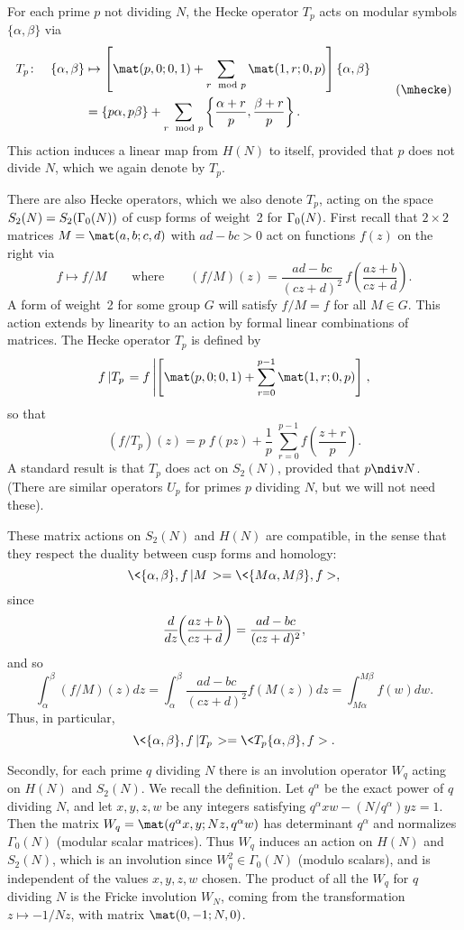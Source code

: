 For each prime $p$ not dividing $N$, the Hecke operator $T_p$
acts on modular symbols $\{\alpha,\beta\}$ via \neweq{\mhecke}
$$
\aligned
  T_p\colon\quad \{\alpha,\beta\} &\mapsto \left[\mat(p,0;0,1)
                     + \sum_{r \mod p}\mat(1,r;0,p)\right]\{\alpha,\beta\} \\
                                  &= \{p\alpha,p\beta\} +
          \sum_{r \mod p}\left\{\frac{\alpha+r}{p},\frac{\beta+r}{p}\right\}.
\endaligned\tag \mhecke
$$
This action induces a linear map from $H(N)$ to itself, provided that $p$
does not divide $N$, which we again denote by $T_p$.

There are also Hecke operators, which we also denote $T_p$, acting on the
space $S_2(N)=S_2(\G0(N))$ of cusp forms of weight~2 for $\G0(N)$.  
First recall that $2\times2$ matrices $M=\mat(a,b;c,d)$ with $ad-bc>0$ act on
functions $f(z)$ on the right via
$$
f\mapsto f\slash{M}\qquad\text{where}\qquad
(f\slash{M})(z)=\frac{ad-bc}{(cz+d)^2}\,f\left(\frac{az+b}{cz+d}\right). 
$$
A form of weight~2 for some group $G$ will satisfy $f\slash{M}=f$ for
all $M\in G$.  This action extends by linearity to an action by formal
linear combinations of matrices.  The Hecke operator $T_p$ is defined
by
$$
f\slash{T_p} = f\slash{\left[{\mat(p,0;0,1)} + \sum_{r=0}^{p-1}{\mat(1,r;0,p)}\right]},
$$
so that
$$
  \left(f\slash{T_p}\right)(z) = p\;f(pz) + \frac{1}{p}\;\sum_{r=0}^{p-1}f\left(\frac{z+r}{p}\right).
$$
A standard result is that $T_p$ does act on $S_2(N)$, provided that
$p\ndiv N$.  (There are similar operators $U_p$ for primes $p$
dividing $N$, but we will not need these).

These matrix actions on $S_2(N)$ and $H(N)$ are compatible, in the sense that
they respect the duality between cusp forms and homology:
$$
  \<\{\alpha,\beta\},f\slash{M}> = \<\{M\alpha,M\beta\},f>,
$$
since
$$
\frac{d}{dz}\hskip-3pt\left(\frac{az+b}{cz+d}\right)=\frac{ad-bc}{(cz+d)^2},
$$
and so 
$$
  \int_{\alpha}^{\beta}\left(f\slash{M}\right)(z)dz
= \int_{\alpha}^{\beta}\frac{ad-bc}{(cz+d)^2}f(M(z))dz
= \int_{M\alpha}^{M\beta}f(w)dw.
$$
Thus, in particular,
$$
  \<\{\alpha,\beta\},f\slash{T_p}> = \<T_p\{\alpha,\beta\},f>.
$$

Secondly, for each prime $q$ dividing $N$ there is an involution
operator $W_q$ acting on $H(N)$ and $S_2(N)$.  We recall the
definition.  Let $q^\alpha$ be the exact power of $q$ dividing $N$,
and let $x,y,z,w$ be any integers satisfying
$q^{\alpha}xw-(N/q^{\alpha})yz=1$.  Then the matrix
$W_q=\mat(q^{\alpha}x,y;Nz,q^{\alpha}w)$ has determinant $q^{\alpha}$
and normalizes $\Gamma_0(N)$ (modular scalar matrices).  Thus $W_q$
induces an action on $H(N)$ and $S_2(N)$, which is an involution since
$W_q^2\in\Gamma_0(N)$ (modulo scalars), and is independent of the
values $x,y,z,w$ chosen.  The product of all the $W_q$ for $q$
dividing $N$ is the Fricke involution $W_N$, coming from the
transformation $z\mapsto-1/Nz$, with matrix $\mat(0,-1;N,0)$.

